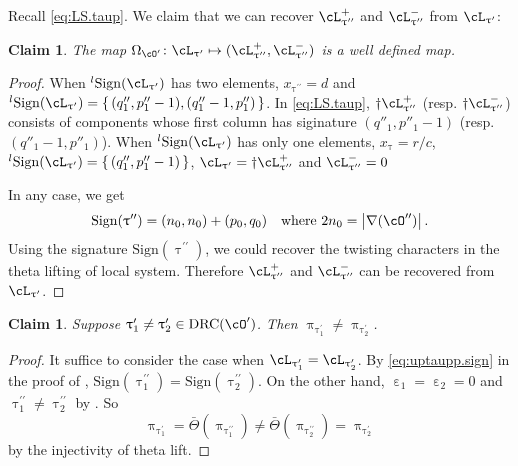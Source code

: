 \documentclass[12pt,a4paper]{amsart}
\newcommand{\trivial}[2][]{\if\relax\detokenize{#1}\relax
  {%
      \color{orange} \vspace{0em} $[$  #2 $]$
      \color{black}
  }
  \else
\ifx#1h
\ifcsname showtrivial\endcsname
{%
    \color{orange} \vspace{0em}  $[$ #2 $]$
    \color{black}
}
\fi
\else {\red Wrong argument!} \fi
\fi
}
\def\abs#1{\left|{#1}\right|}
\def\DD{\nabla}
\numberwithin{equation}{section}
\newtheorem{claim}[thm]{Claim}
\theoremstyle{remark}
\def\half{{\tfrac{1}{2}}}
\def\lsign{{}^l\mathrm{Sign}}
\def\ssign{\mathrm{Sign}}
\def\Thetab{\bar{\Theta}}
\def\drc{\mathrm{DRC}}
\def\cOp{\cO^{\prime}}
\def\cOpp{\cO^{\prime\prime}}
\def\pcL{\cL^+}
\def\ncL{\cL^-}
\def\uptaup{\uptau^{\prime}}
\def\uptaupp{\uptau^{\prime\prime}}
\begin{document}
Recall \eqref{eq:LS.taup}.
We claim that we can recover $\pcL_{\uptaupp}$ and
$\ncL_{\uptaupp}$ from $\cL_{\uptaup}$:
\begin{claim}\label{c:gd.C1}
  The map $\Omega_{\cOp}\colon \cL_{\uptaup}\mapsto (\pcL_{\uptaupp},\ncL_{\uptaupp})$ is a well
  defined map.
\end{claim}
\begin{proof}
  When $\lsign(\cL_{\uptaup})$ has two elements, $x_{\uptaupp}=d$ and
  $\lsign(\cL_{\uptaup}) = \set{(q''_{1},p''_{1}-1),(q''_{1}-1,p''_{1})}$. In
  \eqref{eq:LS.taup}, $\dagger\pcL_{\uptaupp}$ (resp. $\dagger\ncL_{\uptaupp}$)
  consists of components whose first column has siginature $(q''_{1},p''_{1}-1)$
  (resp. $(q''_{1}-1,p''_{1})$). When $\lsign(\cL_{\uptaup})$ has only one
  elements, $x_{\uptau}=r/c$,
  $\lsign(\cL_{\uptaup}) = \set{(q''_{1},p''_{1}-1)}$,
  $\cL_{\uptaup} = \dagger\pcL_{\uptaupp}$ and $\ncL_{\uptaupp}=0$

  In any case, we get
  \begin{equation}\label{eq:uptaupp.sign}
    \ssign(\uptaupp) = (n_{0},n_{0})+(p_{0},q_{0})\quad \text{where }
    2n_{0} = \abs{\DD(\cOpp)}.
  \end{equation}
  Using the signature $\ssign(\uptaupp)$, we could recover the twisting
  characters in the theta lifting of local system. Therefore
  $\pcL_{\uptaupp}$ and $\ncL_{\uptaupp}$ can be recovered from  $\cL_{\uptaup}$.
\end{proof}


\begin{claim}\label{c:gd.C3}
  Suppose $\uptaup_{1}\neq \uptaup_{2}\in \drc(\cOp)$. Then
  $\uppi_{\uptaup_{1}}\neq \uppi_{\uptaup_{2}}$.
\end{claim}
\begin{proof}
  It suffice to consider the case when $\cL_{\uptaup_{1}} = \cL_{\uptaup_{2}}$.
 By \eqref{eq:uptaupp.sign} in the proof of ,
 $\ssign(\uptaupp_{1}) = \ssign(\uptaupp_{2})$.
 On the other hand, $\upepsilon_{1}=\upepsilon_{2}=0$ and
 $\uptaupp_{1}\neq \uptaupp_{2}$ by . So
 \[
   \uppi_{\uptaup_{1}} = \Thetab(\uppi_{\uptaupp_{1}})\neq\Thetab(\uppi_{\uptaupp_{2}}) = \uppi_{\uptaup_{2}}
 \]
  by the injectivity of theta lift.
\end{proof}
\end{document}
